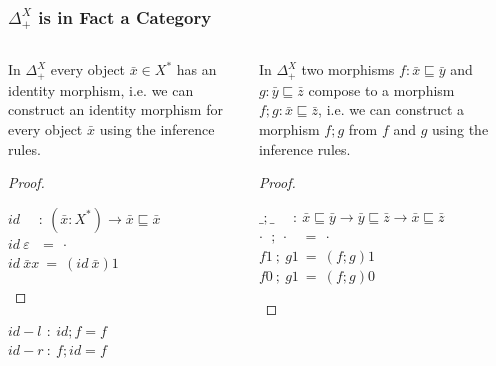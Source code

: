 \documentclass[aspectratio=169]{beamer}
\theoremstyle{remarkstyle}
\begin{document}
\begin{frame}[fragile]
  \frametitle{$Δ_+^X$ is in Fact a Category}
  \begin{columns}
    \begin{column}{0.33\textwidth}
      \begin{lemma}
        \begin{small}
          In $Δ_+^X$ every object $\bar{x} ∈ X^*$ has an identity morphism, 
          i.e. we can construct an identity morphism for every object $\bar{x}$ using the inference rules.
        \end{small}
      \end{lemma}
      \begin{proof}
        \begin{small}
        $id \ \ \ \ \ \ : \ (\bar{x} : X^*) → \bar{x} ⊑ \bar{x}$\\
        $id \ ε \ \ \ = \ ·$\\
        $id \ \bar{x} x \ = \ (id \ \bar{x})1$
        \end{small}
      \end{proof}
      \begin{corollary}
        \begin{small}
        $id-l \ \, : \ id ; f = f$ \\
        $id-r \ : \ f;id = f$
        \end{small}
      \end{corollary}  
    \end{column}
    \begin{column}{0.62\textwidth}
      \begin{lemma}
        \begin{small}
        In $Δ_+^X$ two morphisms $f : \bar{x} ⊑ \bar{y}$ and $g : \bar{y} ⊑ \bar{z}$ 
        compose to a morphism $f;g : \bar{x} ⊑ \bar{z}$, 
        i.e. we can construct a morphism $f;g$ from $f$ and $g$ using the inference rules.
        \end{small}
      \end{lemma}
      \begin{proof}
        \begin{small}
        $\_;\_ \ \ \ \ \ \ : \ \bar{x} ⊑ \bar{y} → \bar{y} ⊑ \bar{z} → \bar{x} ⊑ \bar{z}$\\
        $·  \ \ \, ; \ · \ \ \ \ = \ ·$\\
        $f 1  \ ; \ g 1 \ = \ (f;g)1$\\
        $f 0 \ ; \ g 1  \ = \ (f;g)0$\\

\end{small}
\end{proof}
\end{column}
\end{columns}
\end{frame}
\end{document}
